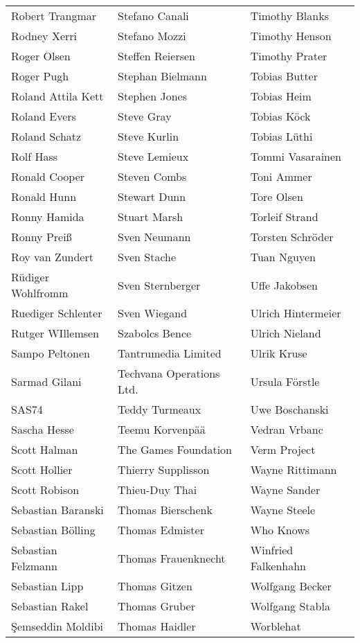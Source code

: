 \begin{small}
\begin{tabular}{p{4cm}p{4cm}p{4cm}}
Robert Trangmar & Stefano Canali & Timothy Blanks \\
Rodney Xerri & Stefano Mozzi & Timothy Henson \\
Roger Olsen & Steffen Reiersen & Timothy Prater \\
Roger Pugh & Stephan Bielmann & Tobias Butter \\
Roland Attila Kett & Stephen Jones & Tobias Heim \\
Roland Evers & Steve Gray & Tobias Köck \\
Roland Schatz & Steve Kurlin & Tobias Lüthi \\
Rolf Hass & Steve Lemieux & Tommi Vasarainen \\
Ronald Cooper & Steven Combs & Toni Ammer \\
Ronald Hunn & Stewart Dunn & Tore Olsen \\
Ronny Hamida & Stuart Marsh & Torleif Strand \\
Ronny Preiß & Sven Neumann & Torsten Schröder \\
Roy van Zundert & Sven Stache & Tuan Nguyen \\
Rüdiger Wohlfromm & Sven Sternberger & Uffe Jakobsen \\
Ruediger Schlenter & Sven Wiegand & Ulrich Hintermeier \\
Rutger WIllemsen & Szabolcs Bence & Ulrich Nieland \\
Sampo Peltonen & Tantrumedia Limited & Ulrik Kruse \\
Sarmad Gilani & Techvana Operations Ltd. & Ursula Förstle \\
SAS74 & Teddy Turmeaux & Uwe Boschanski \\
Sascha Hesse & Teemu Korvenpää & Vedran Vrbanc \\
Scott Halman & The Games Foundation & Verm Project \\
Scott Hollier & Thierry Supplisson & Wayne Rittimann \\
Scott Robison & Thieu-Duy Thai & Wayne Sander \\
Sebastian Baranski & Thomas Bierschenk & Wayne Steele \\
Sebastian Bölling & Thomas Edmister & Who Knows \\
Sebastian Felzmann & Thomas Frauenknecht & Winfried Falkenhahn \\
Sebastian Lipp & Thomas Gitzen & Wolfgang Becker \\
Sebastian Rakel & Thomas Gruber & Wolfgang Stabla \\
Şemseddin Moldibi & Thomas Haidler & Worblehat \\

\end{tabular}
\end{small}
